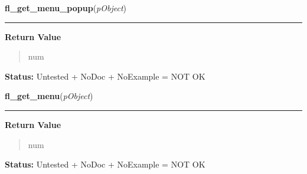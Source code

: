     \label{xformslib:library:fl_get_menu_popup}

    \vspace{0.5ex}

\hspace{.8\funcindent}\begin{boxedminipage}{\funcwidth}

    \raggedright \textbf{fl\_get\_menu\_popup}(\textit{pObject})

    \vspace{-1.5ex}

    \rule{\textwidth}{0.5\fboxrule}
\setlength{\parskip}{2ex}
\setlength{\parskip}{1ex}
      \textbf{Return Value}
    \vspace{-1ex}

      \begin{quote}
      num

      \end{quote}

\textbf{Status:} Untested + NoDoc + NoExample = NOT OK



    \end{boxedminipage}

    \label{xformslib:library:fl_get_menu}

    \vspace{0.5ex}

\hspace{.8\funcindent}\begin{boxedminipage}{\funcwidth}

    \raggedright \textbf{fl\_get\_menu}(\textit{pObject})

    \vspace{-1.5ex}

    \rule{\textwidth}{0.5\fboxrule}
\setlength{\parskip}{2ex}
\setlength{\parskip}{1ex}
      \textbf{Return Value}
    \vspace{-1ex}

      \begin{quote}
      num

      \end{quote}

\textbf{Status:} Untested + NoDoc + NoExample = NOT OK



    \end{boxedminipage}

